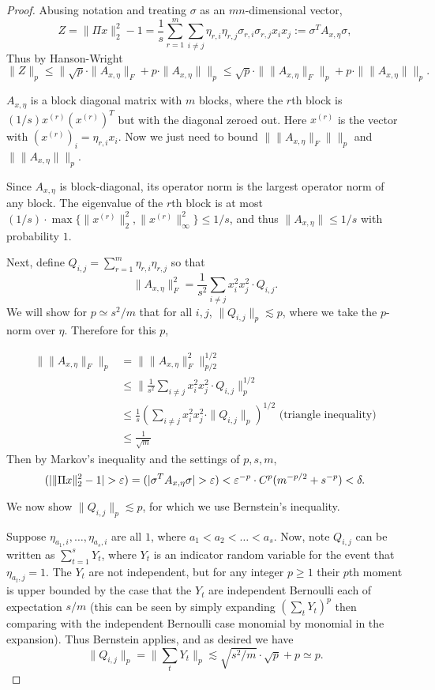 \documentclass[11pt]{article}
\let\Pr\relax
\DeclareMathOperator*{\Pr}{\mathbb{P}}
\newcommand{\eps}{\varepsilon}
\begin{document}
\begin{proof}
Abusing notation and treating $\sigma$ as an $mn$-dimensional vector,
$$
Z = \|\Pi x\|_2^2 - 1 = \frac 1s \sum_{r=1}^m\sum_{i\neq j} \eta_{r,i}\eta_{r,j} \sigma_{r,i}\sigma_{r,j} x_i x_j := \sigma^T A_{x,\eta} \sigma ,
$$
Thus by Hanson-Wright
$$\|Z\|_p \le \|\sqrt{p}\cdot\|A_{x,\eta}\|_F + p\cdot\|A_{x,\eta}\|\|_p \le \sqrt{p}\cdot\|\|A_{x,\eta}\|_F\|_p + p\cdot\|\|A_{x,\eta}\|\|_p .$$

$A_{x,\eta}$ is a block diagonal matrix with $m$ blocks, where the $r$th block is $(1/s) x^{(r)} (x^{(r)})^T$ but with the diagonal zeroed out. Here $x^{(r)}$ is the vector with $(x^{(r)})_i = \eta_{r,i} x_i$. Now we just need to bound $\|\|A_{x,\eta}\|_F\|\|_p$ and $\|\|A_{x,\eta}\|\|_p$.


Since $A_{x,\eta}$ is block-diagonal, its operator norm is the largest operator norm of any block. The eigenvalue of the $r$th block is at most $(1/s)\cdot \max\{ \|x^{(r)}\|_2^2, \|x^{(r)}\|_\infty^2\} \le 1/s$, and thus $\|A_{x,\eta}\| \le 1/s$ with probability $1$.

Next, define $Q_{i,j} = \sum_{r=1}^m \eta_{r,i} \eta_{r,j}$ so that
$$
\|A_{x,\eta}\|_F^2 = \frac 1{s^2} \sum_{i\neq j} x_i^2 x_j^2 \cdot Q_{i,j} .
$$
We will show for $p \simeq s^2/m$ that for all $i, j$, $\|Q_{i,j}\|_p \lesssim p$, where we take the $p$-norm over $\eta$. Therefore for this $p$,

\begin{align*}
\|\|A_{x,\eta}\|_F\|_p &= \|\|A_{x,\eta}\|_F^2\|_{p/2}^{1/2}\\
{}&\le\|\frac 1{s^2} \sum_{i\neq j} x_i^2 x_j^2\cdot Q_{i,j}\|_p^{1/2}\\
{}&\le \frac 1{s} \left(\sum_{i\neq j} x_i^2 x_j^2\cdot \|Q_{i,j}\|_p\right)^{1/2}\text{ (triangle inequality)}\\
{}&\le \frac 1{\sqrt{m}}
\end{align*}
Then by Markov's inequality and the settings of $p, s, m$,
$$
\Pr(|\|\Pi x\|_2^2 - 1| > \eps) = \Pr(|\sigma^T A_{x,\eta}\sigma| > \eps) < \eps^{-p}\cdot C^p(m^{-p/2} + s^{-p}) < \delta .
$$



We now show $\|Q_{i,j}\|_p \lesssim p$, for which we use Bernstein's inequality.

Suppose $\eta_{a_1,i}, \ldots, \eta_{a_s, i}$ are all $1$, where $a_1 < a_2 < \ldots < a_s$. Now, note $Q_{i,j}$ can be written as $\sum_{t=1}^s Y_t$, where $Y_t$ is an indicator random variable for the event that $\eta_{a_t, j} = 1$. The $Y_t$ are not independent, but for any integer $p\ge 1$ their $p$th moment is upper bounded by the case that the $Y_t$ are independent Bernoulli each of expectation $s/m$ (this can be seen by simply expanding $(\sum_t Y_t)^p$ then comparing with the independent Bernoulli case monomial by monomial in the expansion). Thus Bernstein applies, and as desired we have
$$
\|Q_{i,j}\|_p = \|\sum_t Y_t\|_p \lesssim \sqrt{s^2/m}\cdot \sqrt{p} + p \simeq p .
$$


\end{proof}
\end{document}
